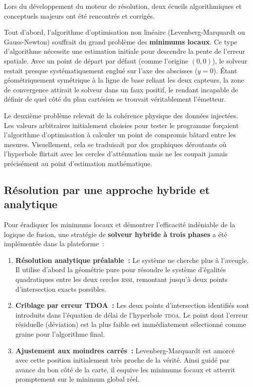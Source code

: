 \documentclass[12pt, a4paper]{article}
\newcommand{\TDOA}{\textsc{tdoa}}
\newcommand{\RSSI}{\textsc{rssi}}
\begin{document}
Lors du développement du moteur de résolution, deux écueils algorithmiques et conceptuels majeurs ont été rencontrés et corrigés.

Tout d'abord, l'algorithme d'optimisation non linéaire (Levenberg-Marquardt ou Gauss-Newton) souffrait du grand problème des \textbf{minimums locaux}. Ce type d'algorithme nécessite une estimation initiale pour \og{}descendre\fg{} la pente de l'erreur spatiale. Avec un point de départ par défaut (comme l'origine $(0,0)$), le solveur restait presque systématiquement englué sur l'axe des abscisses ($y=0$). Étant géométriquement symétrique à la ligne de base reliant les deux capteurs, la zone de convergence attirait le solveur dans un faux positif, le rendant incapable de définir de quel côté du plan cartésien se trouvait véritablement l'émetteur.

Le deuxième problème relevait de la cohérence physique des données injectées. Les valeurs arbitraires initialement choisies pour tester le programme forçaient l'algorithme d'optimisation à calculer un point de compromis \og{}bâtard\fg{} entre les mesures. Visuellement, cela se traduisait par des graphiques déroutants où l'hyperbole flirtait avec les cercles d'atténuation mais ne les coupait jamais précisément au point d'estimation mathématique.

\subsection{Résolution par une approche hybride et analytique}

Pour éradiquer les minimums locaux et démontrer l'efficacité indéniable de la logique de fusion, une stratégie de \textbf{solveur hybride à trois phases} a été implémentée dans la plateforme~:

\begin{enumerate}[label=\textbf{\arabic*.}]
  \item \textbf{Résolution analytique préalable~:} Le système ne cherche plus à l'aveugle. Il utilise d'abord la géométrie pure pour résoudre le système d'égalités quadratiques entre les deux cercles \RSSI{}, remontant jusqu'à deux points d'intersection exacts possibles.
  \item \textbf{Criblage par erreur TDOA~:} Les deux points d'intersection identifiés sont introduits dans l'équation de délai de l'hyperbole \TDOA{}. Le point dont l'erreur résiduelle (déviation) est la plus faible est immédiatement sélectionné comme \og{}graine\fg{} pour l'algorithme final.
  \item \textbf{Ajustement aux moindres carrés~:} Levenberg-Marquardt est amorcé avec cette position initialement très proche de la vérité. Ainsi guidé par avance du bon côté de la carte, il esquive les minimums focaux et atterrit promptement sur le minimum global réel.
\end{enumerate}
\end{document}
